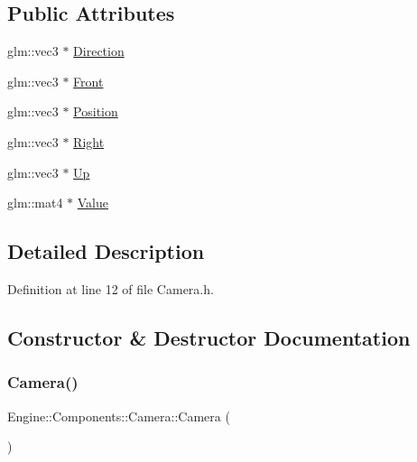\subsection*{Public Attributes}
\begin{DoxyCompactItemize}
\item 
glm\+::vec3 $\ast$ \mbox{\hyperlink{classEngine_1_1Components_1_1Camera_a23619a66046258f1158313f0c790ffa2}{Direction}}
\item 
glm\+::vec3 $\ast$ \mbox{\hyperlink{classEngine_1_1Components_1_1Camera_a9d8692aa379c9ab00f69df10d1d3651b}{Front}}
\item 
glm\+::vec3 $\ast$ \mbox{\hyperlink{classEngine_1_1Components_1_1Camera_ab2c3ed9a1321a95db8fca95bc7f4b290}{Position}}
\item 
glm\+::vec3 $\ast$ \mbox{\hyperlink{classEngine_1_1Components_1_1Camera_a10b30289c89694d13918a979bade13d9}{Right}}
\item 
glm\+::vec3 $\ast$ \mbox{\hyperlink{classEngine_1_1Components_1_1Camera_a84a4199b9c60579a0f148b9980e05200}{Up}}
\item 
glm\+::mat4 $\ast$ \mbox{\hyperlink{classEngine_1_1Components_1_1Camera_a5d131a78545d9f70496549946503b27a}{Value}}
\end{DoxyCompactItemize}


\subsection{Detailed Description}


Definition at line 12 of file Camera.\+h.



\subsection{Constructor \& Destructor Documentation}
\mbox{\label{classEngine_1_1Components_1_1Camera_ae8ad7f42b61412322436eadfa5261d5e}} 
\subsubsection{\texorpdfstring{Camera()}{Camera()}}
{\footnotesize\ttfamily Engine\+::\+Components\+::\+Camera\+::\+Camera (\begin{DoxyParamCaption}{ }\end{DoxyParamCaption})}



